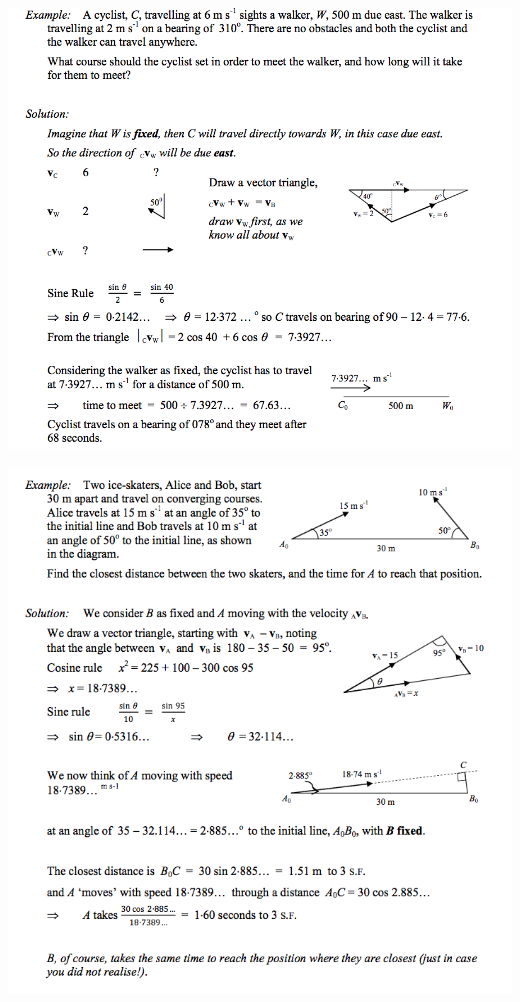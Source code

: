 \documentclass[a4paper]{article}
\begin{document}
\begin{center}
    \includegraphics[scale=0.5]{img_M/15_eg1}
\end{center}
\begin{center}
    \includegraphics[scale=0.5]{img_M/15_eg2}
\end{center}
\end{document}
